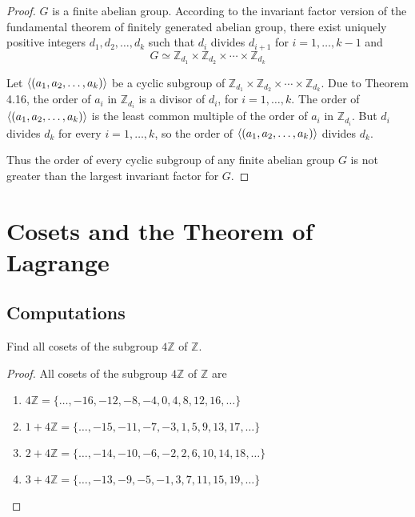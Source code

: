 \begin{proof}
    $G$ is a finite abelian group. According to the invariant factor version of the fundamental theorem of finitely generated abelian group, there exist uniquely positive integers $d_{1}, d_{2}, \ldots, d_{k}$ such that $d_{i}$ divides $d_{i+1}$ for $i = 1,\ldots,k-1$ and
    \[
        G \simeq \mathbb{Z}_{d_{1}} \times \mathbb{Z}_{d_{2}} \times \cdots \times \mathbb{Z}_{d_{k}}
    \]

    Let $\left\langle{(a_{1}, a_{2}, \ldots, a_{k})}\right\rangle$ be a cyclic subgroup of $\mathbb{Z}_{d_{1}} \times \mathbb{Z}_{d_{2}} \times \cdots \times \mathbb{Z}_{d_{k}}$. Due to Theorem 4.16, the order of $a_{i}$ in $\mathbb{Z}_{d_{i}}$ is a divisor of $d_{i}$, for $i = 1,\ldots, k$. The order of $\left\langle{(a_{1}, a_{2}, \ldots, a_{k})}\right\rangle$ is the least common multiple of the order of $a_{i}$ in $\mathbb{Z}_{d_{i}}$. But $d_{i}$ divides $d_{k}$ for every $i = 1,\ldots, k$, so the order of $\left\langle{(a_{1}, a_{2}, \ldots, a_{k})}\right\rangle$ divides $d_{k}$.

    Thus the order of every cyclic subgroup of any finite abelian group $G$ is not greater than the largest invariant factor for $G$.
\end{proof}

\newpage
\section{Cosets and the Theorem of Lagrange}

\subsection*{Computations}

\newpage
\begin{exercise}
    Find all cosets of the subgroup $4\mathbb{Z}$ of $\mathbb{Z}$.
\end{exercise}

\begin{proof}
    All cosets of the subgroup $4\mathbb{Z}$ of $\mathbb{Z}$ are
    \begin{enumerate}[label={(\arabic*)}]
        \item $4\mathbb{Z} = \{ \ldots, -16, -12, -8, -4, 0, 4, 8, 12, 16, \ldots \}$
        \item $1 + 4\mathbb{Z} = \{ \ldots, -15, -11, -7, -3, 1, 5, 9, 13, 17, \ldots \}$
        \item $2 + 4\mathbb{Z} = \{ \ldots, -14, -10, -6, -2, 2, 6, 10, 14, 18, \ldots \}$
        \item $3 + 4\mathbb{Z} = \{ \ldots, -13, -9, -5, -1, 3, 7, 11, 15, 19, \ldots \}$
    \end{enumerate}
\end{proof}

